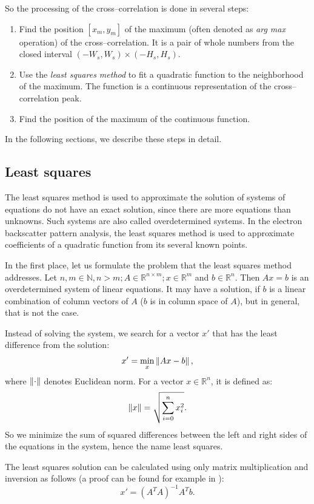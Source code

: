 So the processing of the cross--correlation is done in several steps:
\begin{enumerate}
	\item Find the position $[x_m,y_m]$ of the maximum (often denoted as \emph{arg max} operation) of the cross--correlation. It is a pair of whole numbers from the closed interval $(-W_s, W_s) \times (-H_s, H_s)$.
	\item Use the \emph{least squares method} to fit a quadratic function to the neighborhood of the maximum. The function is a continuous representation of the cross--correlation peak.
	\item Find the position of the maximum of the continuous function.
\end{enumerate}

In the following sections, we describe these steps in detail.

\subsection{Least squares}
The least squares method is used to approximate the solution of systems of equations do not have an exact solution, since there are more equations than unknowns. Such systems are also called overdetermined systems. In the electron backscatter pattern analysis, the least squares method is used to approximate coefficients of a quadratic function from its several known points.

In the first place, let us formulate the problem that the least squares method addresses. Let $n,m \in \mathbb{N}, n > m; A \in \mathbb{R}^{n \times m}; x \in \mathbb{R}^m$ and $b \in \mathbb{R}^n$. Then $Ax = b$ is an overdetermined system of linear equations. It may have a solution, if $b$ is a linear combination of column vectors of $A$ ($b$ is in column space of $A$), but in general, that is not the case.

Instead of solving the system, we search for a vector $x'$ that has the least difference from the solution:
\[
x' = \min_x \left\lVert Ax - b\right\rVert,
\]
where $\left\lVert\cdot\right\rVert$ denotes Euclidean norm. For a vector $x \in \mathbb{R}^n$, it is defined as:
\[
\left\lVert x\right\rVert = \sqrt{\sum_{i=0}^{n} x_i^2}.
\]
So we minimize the sum of squared differences between the left and right sides of the equations in the system, hence the name least squares.

The least squares solution can be calculated using only matrix multiplication and inversion as follows (a proof can be found for example in \cite{anton2013elementary}):  
\[
x' = (A^TA)^{-1}A^Tb.
\]

